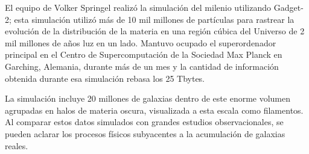 \documentclass[a4paper,openright,12pt]{book}
\begin{document}
\begin{figure}
\end{figure}

El equipo de Volker Springel realizó la simulación del milenio \cite{3.0.3}utilizando Gadget-2; esta simulación utilizó más de 10 mil millones de partículas para rastrear la evolución de la distribución de la materia en una región cúbica del Universo de 2 mil millones de años luz en un lado. Mantuvo ocupado el superordenador principal en el Centro de Supercomputación de la Sociedad Max Planck en Garching, Alemania, durante más de un mes y la cantidad de información obtenida durante esa simulación rebasa los 25 Tbytes.

La simulación incluye 20 millones de galaxias dentro de este enorme volumen agrupadas en halos de materia oscura, visualizada a esta escala como filamentos. Al comparar estos datos simulados con grandes estudios observacionales, se pueden aclarar los procesos físicos subyacentes a la acumulación de galaxias reales.\\\\\\\\\\\\\\\\\\\\\\\\\\\\
\end{document}
